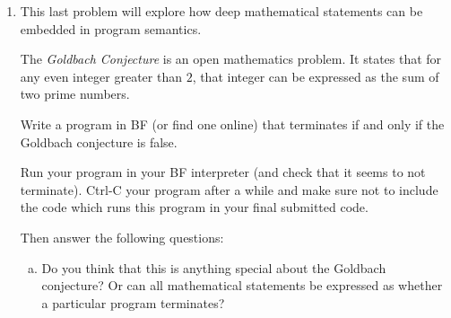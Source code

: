 \documentclass{article}
\begin{document}
\begin{enumerate}
\begin{enumerate}[(a)]
\item Prove, by giving a specific example, that the other way around is possible:
that is, it is possible for a nondeterministic programming language to simulate a deterministic one.

\item
Prove that, despite part (a), it is possible for a deterministic programming language to simulate a nondeterministic
one in the following different sense:
if we are allowed to modify the input by adding additional integers to the \texttt{INPUT} sequence.
The modified criteria for simulation is as follows:
For all $\texttt{INPUT}_1$ and \texttt{OUTPUT},
$$
(\texttt{INPUT}_1, p_1, \texttt{OUTPUT}) \in \texttt{Semantics1}
$$
iff there exists $\texttt{INPUT}_2$ such that:
$$
(\texttt{INPUT}_2, f(p_1), \texttt{OUTPUT}) \in \texttt{Semantics2} \text{ and } \texttt{project}(\texttt{INPUT}_2) = \texttt{INPUT}_1
$$

where above, $\texttt{project}$ denotes an additional function defined by the simulation which takes
$\texttt{INPUT}_2$ and gives back $\texttt{INPUT}_1$.
The intuition should be as follows:
$\texttt{INPUT}_2$ contains some additional input to the deterministic language, beyond what was present in the nondeterministic one.
\end{enumerate}


\item
This last problem will explore how deep mathematical statements can be embedded in program semantics.

The \emph{Goldbach Conjecture} is an open mathematics problem.
It states that for any even integer greater than $2$, that integer can be expressed
as the sum of two prime numbers.

Write a program in BF (or find one online) that terminates if and only if the Goldbach conjecture is false.

Run your program in your BF interpreter (and check that it seems to not terminate).
Ctrl-C your program after a while and make sure not to include the code which runs this program
in your final submitted code.

Then answer the following questions:
\begin{enumerate}[(a)]
\item Do you think that this is anything special about the Goldbach conjecture? Or can all mathematical statements
be expressed as whether a particular program terminates?


\end{enumerate}
\end{enumerate}
\end{document}
